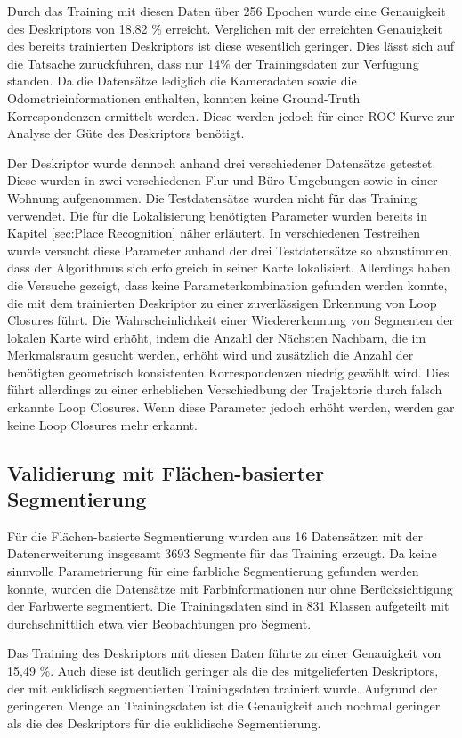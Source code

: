 Durch das Training mit diesen Daten über 256 Epochen wurde eine Genauigkeit des Deskriptors von 18,82 \% erreicht. Verglichen mit der erreichten Genauigkeit des bereits trainierten Deskriptors ist diese wesentlich geringer. Dies lässt sich auf die Tatsache zurückführen, dass nur 14\% der Trainingsdaten zur Verfügung standen. Da die Datensätze lediglich die Kameradaten sowie die Odometrieinformationen enthalten, konnten keine Ground-Truth Korrespondenzen ermittelt werden. Diese werden jedoch für einer ROC-Kurve zur Analyse der Güte des Deskriptors benötigt. 

Der Deskriptor wurde dennoch anhand drei verschiedener Datensätze getestet. Diese wurden in zwei verschiedenen Flur und Büro Umgebungen sowie in einer Wohnung aufgenommen. Die Testdatensätze wurden nicht für das Training verwendet. Die für die Lokalisierung benötigten Parameter wurden bereits in Kapitel \ref{sec:Place Recognition} näher erläutert. In verschiedenen Testreihen wurde versucht diese Parameter anhand der drei Testdatensätze so abzustimmen, dass der Algorithmus sich erfolgreich in seiner Karte lokalisiert. Allerdings haben die Versuche gezeigt, dass keine Parameterkombination gefunden werden konnte, die mit dem trainierten Deskriptor zu einer zuverlässigen Erkennung von Loop Closures führt. Die Wahrscheinlichkeit einer Wiedererkennung von Segmenten der lokalen Karte wird erhöht, indem die Anzahl der Nächsten Nachbarn, die im Merkmalsraum gesucht werden, erhöht wird und zusätzlich die Anzahl der benötigten geometrisch konsistenten Korrespondenzen niedrig gewählt wird. Dies führt allerdings zu einer erheblichen Verschiedbung der Trajektorie durch falsch erkannte Loop Closures. Wenn diese Parameter jedoch erhöht werden, werden gar keine Loop Closures mehr erkannt. 

\subsection{Validierung mit Flächen-basierter Segmentierung}

Für die Flächen-basierte Segmentierung wurden aus 16 Datensätzen mit der Datenerweiterung insgesamt 3693 Segmente für das Training erzeugt. Da keine sinnvolle Parametrierung für eine farbliche Segmentierung gefunden werden konnte, wurden die Datensätze mit Farbinformationen nur ohne Berücksichtigung der Farbwerte segmentiert. Die Trainingsdaten sind in 831 Klassen aufgeteilt mit durchschnittlich etwa vier Beobachtungen pro Segment. 

Das Training des Deskriptors mit diesen Daten führte zu einer Genauigkeit von 15,49 \%. Auch diese ist deutlich geringer als die des mitgelieferten Deskriptors, der mit euklidisch segmentierten Trainingsdaten trainiert wurde. Aufgrund der geringeren Menge an Trainingsdaten ist die Genauigkeit auch nochmal geringer als die des Deskriptors für die euklidische Segmentierung. 

